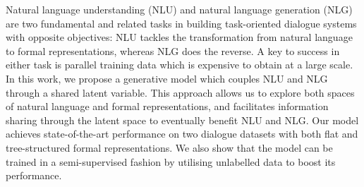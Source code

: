 Natural language understanding (NLU) and natural language generation (NLG) are two fundamental and related tasks in building task-oriented dialogue systems with opposite objectives: NLU tackles the transformation from natural language to formal representations, whereas NLG does the reverse. A key to success in either task is parallel training data which is expensive to obtain at a large scale. In this work, we propose a generative model which couples NLU and NLG through a shared latent variable. This approach allows us to explore both spaces of natural language and formal representations, and facilitates information sharing through the latent space to eventually benefit NLU and NLG. Our model achieves state-of-the-art performance on two dialogue datasets with both flat and tree-structured formal representations. We also show that the model can be trained in a semi-supervised fashion by utilising unlabelled data to boost its performance.
